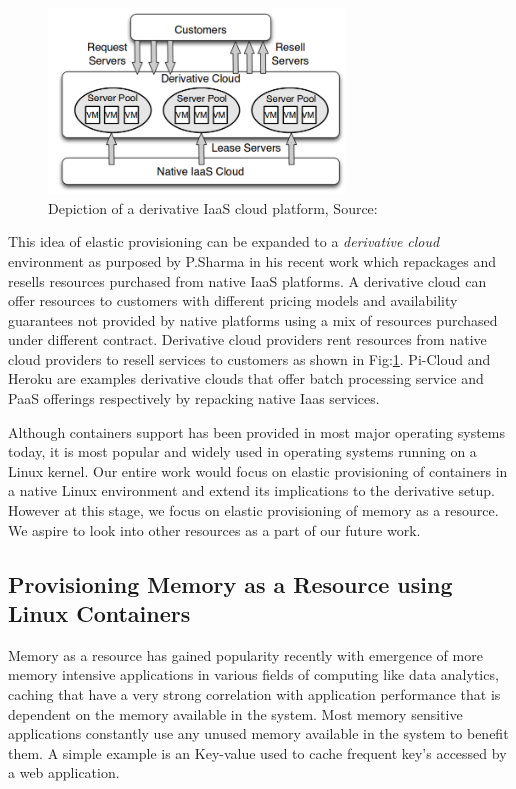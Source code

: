     \begin{figure}
      \centering
      \includegraphics[width=0.7\textwidth]{images/derivative_cloud.png}
      \caption{Depiction of a derivative IaaS cloud platform, Source:\cite{sharma2015spotcheck}}
      \label{img_derivative_cloud}
    \end{figure}

    This idea of elastic provisioning can be expanded to a \textit{derivative cloud} environment as purposed by P.Sharma in his recent work 
\cite{sharma2015spotcheck} which repackages and resells resources purchased from native IaaS platforms. A derivative cloud can offer 
resources to customers with different pricing models and availability guarantees not provided by native platforms using a mix of resources  
purchased under different contract. Derivative cloud providers rent resources from native cloud providers to resell services to customers 
as shown in Fig:\ref{img_derivative_cloud}. Pi-Cloud\cite{picloud} and Heroku\cite{heroku} are examples derivative clouds that offer batch 
processing service and PaaS offerings respectively by repacking native Iaas services. 

    Although containers support has been provided in most major operating systems today, it is most popular and widely used in operating 
systems running on a Linux kernel. Our entire work would focus on elastic provisioning of containers in a native Linux environment and 
extend its implications to the derivative setup. However at this stage, we focus on elastic provisioning of memory as a resource. We aspire 
to look into other resources as a part of our future work.
   
    \subsection{Provisioning Memory as a Resource using Linux Containers}
  
      Memory as a resource has gained popularity recently with emergence of more memory intensive applications in various fields of 
computing like data analytics, caching that have a very strong correlation with application performance that is dependent on the memory 
available in the system. Most memory sensitive applications constantly use any unused memory available in the system to benefit them. A 
simple example is an Key-value used to cache frequent key's accessed by a web application. 


